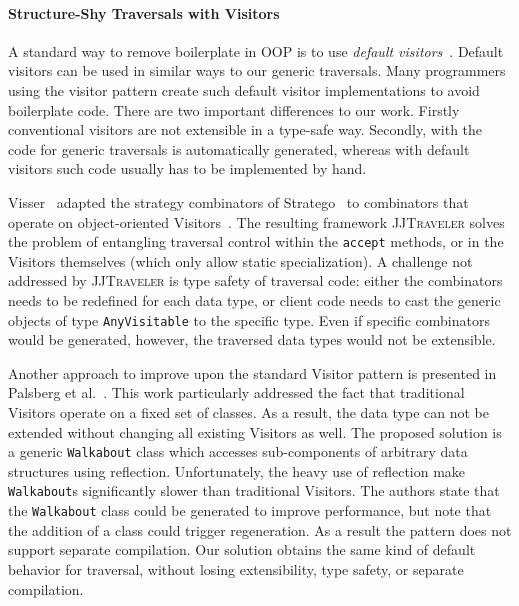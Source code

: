 \paragraph{Structure-Shy Traversals with Visitors}
A standard way to remove boilerplate in OOP is to use \emph{default
  visitors}~\cite{nordberg96variations}. Default visitors can be used
in similar ways to our generic traversals. Many programmers using 
the visitor pattern create such default visitor implementations to
avoid boilerplate code. There are two important differences to 
our work. Firstly conventional visitors are not extensible in a
type-safe way. Secondly, with \name the code for generic traversals 
is automatically generated, whereas with default visitors such code
usually has to be implemented by hand. 

Visser~\cite{visser01visitor} adapted the strategy combinators of Stratego~\cite{visser1998core,Visser:1998:BPO:289423.289425} to combinators that operate on object-oriented Visitors~\cite{gof}.
The resulting framework \textsc{JJTraveler} solves the problem of entangling traversal control within the \lstinline{accept} methods, or in the Visitors themselves (which only allow static specialization).
A challenge not addressed by \textsc{JJTraveler} is type safety of traversal code: either the combinators needs to be redefined for each data type, or client code needs to cast the generic objects of type \lstinline{AnyVisitable} to the specific type.
Even if specific combinators would be generated, however, the traversed data types would not be extensible.

Another approach to improve upon the standard Visitor pattern is presented in Palsberg et al.~\cite{palsberg98essence}.
This work particularly addressed the fact that traditional Visitors operate on a fixed set of classes. As a result, the data type can not be extended without changing all existing Visitors as well.
The proposed solution is a generic \lstinline{Walkabout} class which accesses sub-components of arbitrary data structures using reflection.
Unfortunately, the heavy use of reflection make \lstinline{Walkabout}s significantly slower than traditional Visitors.
The authors  state that the \lstinline{Walkabout} class could be generated to improve performance, but note that the addition of a class could trigger regeneration. As a result the pattern does not support separate compilation.
Our solution obtains the same kind of default behavior for traversal,  without losing extensibility, type safety, or separate compilation.

